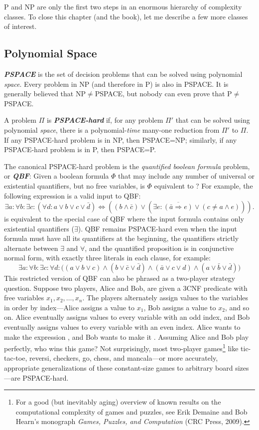 P and NP are only the first two steps in an enormous hierarchy of complexity classes.
To close this chapter (and the book), let me describe a few more classes of interest.

\subsection{Polynomial Space}

\textbf{\textit{PSPACE}} is the set of decision problems that can be solved using polynomial \textit{space}.
Every problem in NP (and therefore in P) is also in PSPACE.
It is generally believed that NP${}\neq{}$PSPACE, but nobody can even prove that P${}\neq{}$PSPACE.

A problem $\Pi$ is \textbf{\textit{PSPACE-hard}} if, for any problem $\Pi'$ that can be solved using polynomial \textit{space}, there is a polynomial-\textit{time} many-one reduction from $\Pi'$ to $\Pi$.
If any PSPACE-hard problem is in NP, then PSPACE=NP; similarly, if any PSPACE-hard problem is in P, then PSPACE=P.

The canonical PSPACE-hard problem is the \textit{quantified boolean formula} problem, or \textbf{\textit{QBF}}: Given a boolean formula $\Phi$ that may include any number of universal or existential quantifiers, but no free variables, is $\Phi$ equivalent to ?
For example, the following expression is a valid input to QBF:
\[
\exists a : \forall b : \exists c : (\forall d : a \vee b \vee c \vee \bar{d}) \Leftrightarrow ((b \wedge \bar{c}) \vee (\exists e : \overline{(\bar{a} \Rightarrow e)} \vee (c \neq a \wedge e))).
\]
 is equivalent to the special case of QBF where the input formula contains only existential quantifiers ($\exists$).
QBF remains PSPACE-hard even when the input formula must have all its quantifiers at the beginning, the quantifiers strictly alternate between $\exists$ and $\forall$, and the quantified proposition is in conjunctive normal form, with exactly three literals in each clause, for example:
\[
\exists a : \forall b : \exists c : \forall d : \bigl((a \vee b \vee c) \wedge (b \vee \bar{c} \vee \bar{d}) \wedge (\bar{a} \vee c \vee d) \wedge (a \vee \bar{b} \vee \bar{d})\bigr)
\]
This restricted version of QBF can also be phrased as a two-player strategy question.
Suppose two players, Alice and Bob, are given a 3CNF predicate with free variables $x_1, x_2, \dots, x_n$.
The players alternately assign values to the variables in order by index---Alice assigns a value to $x_1$, Bob assigns a value to $x_2$, and so on.
Alice eventually assigns values to every variable with an odd index, and Bob eventually assigns values to every variable with an even index.
Alice wants to make the expression , and Bob wants to make it .
Assuming Alice and Bob play perfectly, who wins this game?
Not surprisingly, most two-player games\footnote{For a good (but inevitably aging) overview of known results on the computational complexity of games and puzzles, see Erik Demaine and Bob Hearn’s monograph \textit{Games, Puzzles, and Computation} (CRC Press, 2009).} like tic-tac-toe, reversi, checkers, go, chess, and mancala---or more accurately, appropriate generalizations of these constant-size games to arbitrary board sizes---are PSPACE-hard.

